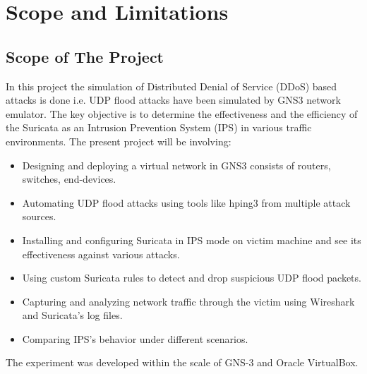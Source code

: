 \chapter{Scope and Limitations}
\section{Scope of The Project}
In this project the simulation of Distributed Denial of Service (DDoS) based attacks is done i.e. UDP flood attacks have been simulated by GNS3 network emulator. The key objective is to determine the effectiveness and the efficiency of the Suricata as an Intrusion Prevention System (IPS) in various traffic environments. The present project will be involving:
\begin{itemize}
    \item Designing and deploying a virtual network in GNS3 consists of routers, switches, end-devices.
    \item Automating UDP flood attacks using tools like hping3 from multiple attack sources.
    \item Installing and configuring Suricata in IPS mode on victim machine and see its effectiveness against various attacks.
    \item Using custom Suricata rules to detect and drop suspicious UDP flood packets.
    \item Capturing and analyzing network traffic through the victim using Wireshark and Suricata's log files.
    \item Comparing IPS's behavior under different scenarios. 
\end{itemize}
The experiment was developed within the scale of GNS-3 and Oracle VirtualBox.
